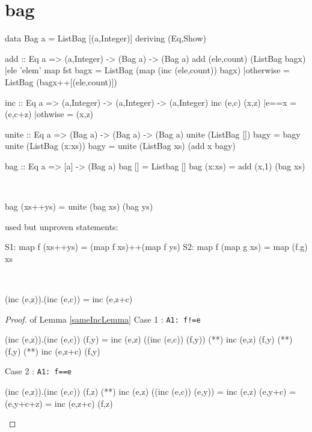 \section{bag}
\begin{code}
data Bag a = ListBag [(a,Integer)] deriving (Eq,Show)
\end{code}
\begin{code}
add :: Eq a => (a,Integer) -> (Bag a) -> (Bag a)
add (ele,count) (ListBag bagx)
    |ele 'elem' map fst bagx = ListBag (map (inc (ele,count)) bagx) 
    |otherwise               = ListBag (bagx++[(ele,count)])
\end{code}
\begin{code}
inc :: Eq a => (a,Integer) -> (a,Integer) -> (a,Integer)
inc (e,c) (x,z)
    |e==x    = (e,c+z)
    |othwise = (x,z)
\end{code}
\begin{code}
unite :: Eq a => (Bag a) -> (Bag a) -> (Bag a)
unite (ListBag [])     bagy = bagy
unite (ListBag (x:xs)) bagy = unite (ListBag xs) (add x bagy)
\end{code}
\begin{code}
bag :: Eq a => [a] -> (Bag a)
bag []     = Listbag []
bag (x:xs) = add (x,1) (bag xs)
\end{code}
\begin{claim}\label{bagClaim}\ 
\begin{code}
bag (xs++ys) = unite (bag xs) (bag ys) 
\end{code}
\end{claim}
used but unproven statements:
\begin{code}
S1: map f (xs++ys) = (map f xs)++(map f ys)
S2: map f (map g xs) = map (f.g) xs
\end{code}
\begin{lemma}\label{sameIncLemma}\ 
\begin{code}
(inc (e,z)).(inc (e,c)) = inc (e,z+c)
\end{code}
\end{lemma}
\begin{proof} of Lemma \ref{sameIncLemma}
Case 1 : \verb|A1: f!=e|
\begin{code}
(inc (e,z)).(inc (e,c)) (f,y) = inc (e,z) ((inc (e,c)) (f,y))
                              (**) inc (e,z) (f,y)
                              (*\sEq{A1}*) (f,y)
                              (*\sEq{A1}*) inc (e,z+c) (f,y)
\end{code}
Case 2 : \verb|A1: f==e|
\begin{code}
(inc (e,z)).(inc (e,c)) (f,z) (**) inc (e,z) ((inc (e,c)) (e,y))
                              = inc (e,z) (e,y+c)
                              = (e,y+c+z)
                              = inc (e,z+c) (f,z)
\end{code}
\end{proof}
